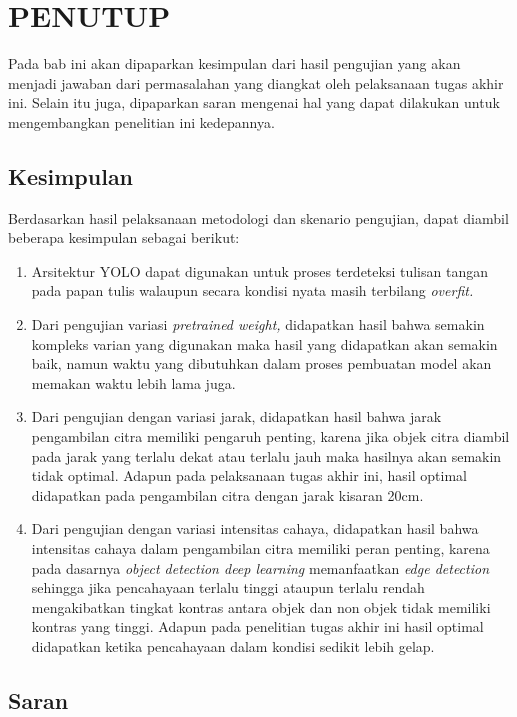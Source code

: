 \chapter{PENUTUP}
\label{chap:penutup}

Pada bab ini akan dipaparkan kesimpulan dari hasil pengujian yang akan menjadi jawaban dari permasalahan yang diangkat oleh pelaksanaan tugas akhir ini. Selain itu juga, dipaparkan saran mengenai hal yang dapat dilakukan untuk mengembangkan penelitian ini kedepannya.

\section{Kesimpulan}
\label{sec:kesimpulan}

Berdasarkan hasil pelaksanaan metodologi dan skenario pengujian, dapat diambil beberapa kesimpulan sebagai berikut:
\begin{enumerate}[nolistsep]
    \item Arsitektur YOLO dapat digunakan untuk proses terdeteksi tulisan tangan pada papan tulis walaupun secara kondisi nyata masih terbilang \textit{overfit.}
    \item Dari pengujian variasi \textit{pretrained weight,} didapatkan hasil bahwa semakin kompleks varian yang digunakan maka hasil yang didapatkan akan semakin baik, namun waktu yang dibutuhkan dalam proses pembuatan model akan memakan waktu lebih lama juga.
    \item Dari pengujian dengan variasi jarak, didapatkan hasil bahwa jarak pengambilan citra memiliki pengaruh penting, karena jika objek citra diambil pada jarak yang terlalu dekat atau terlalu jauh maka hasilnya akan semakin tidak optimal. Adapun pada pelaksanaan tugas akhir ini, hasil optimal didapatkan pada pengambilan citra dengan jarak kisaran 20cm.
    \item Dari pengujian dengan variasi intensitas cahaya, didapatkan hasil bahwa intensitas cahaya dalam pengambilan citra memiliki peran penting, karena pada dasarnya \textit{object detection deep learning} memanfaatkan \textit{edge detection} sehingga jika pencahayaan terlalu tinggi ataupun terlalu rendah mengakibatkan tingkat kontras antara objek dan non objek tidak memiliki kontras yang tinggi. Adapun pada penelitian tugas akhir ini hasil optimal didapatkan ketika pencahayaan dalam kondisi sedikit lebih gelap.
\end{enumerate}

\section{Saran}
\label{chap:saran}

